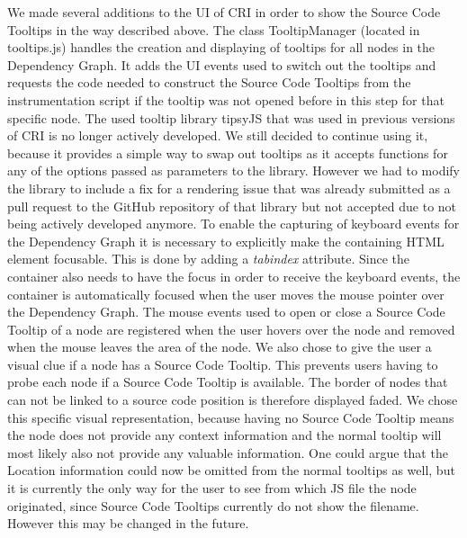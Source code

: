 We made several additions to the UI of CRI in order to show the Source Code Tooltips in the way described above. The class TooltipManager (located in tooltips.js) handles the creation and displaying of tooltips for all nodes in the Dependency Graph. It adds the UI events used to switch out the tooltips and requests the code needed to construct the Source Code Tooltips from the instrumentation script if the tooltip was not opened before in this step for that specific node. The used tooltip library tipsyJS \cite{Tipsy} that was used in previous versions of CRI is no longer actively developed. We still decided to continue using it, because it provides a simple way to swap out tooltips as it accepts functions for any of the options passed as parameters to the library. However we had to modify the library to include a fix for a rendering issue that was already submitted as a pull request to the GitHub repository of that library but not accepted due to not being actively developed anymore. To enable the capturing of keyboard events for the Dependency Graph it is necessary to explicitly make the containing HTML element focusable. This is done by adding a \emph{tabindex} attribute. Since the container also needs to have the focus in order to receive the keyboard events, the container is automatically focused when the user moves the mouse pointer over the Dependency Graph. The mouse events used to open or close a Source Code Tooltip of a node are registered when the user hovers over the node and removed when the mouse leaves the area of the node. We also chose to give the user a visual clue if a node has a Source Code Tooltip. This prevents users having to probe each node if a Source Code Tooltip is available. The border of nodes that can not be linked to a source code position is therefore displayed faded. We chose this specific visual representation, because having no Source Code Tooltip means the node does not provide any context information and the normal tooltip will most likely also not provide any valuable information. One could argue that the Location information could now be omitted from the normal tooltips as well, but it is currently the only way for the user to see from which JS file the node originated, since Source Code Tooltips currently do not show the filename. However this may be changed in the future.
	

